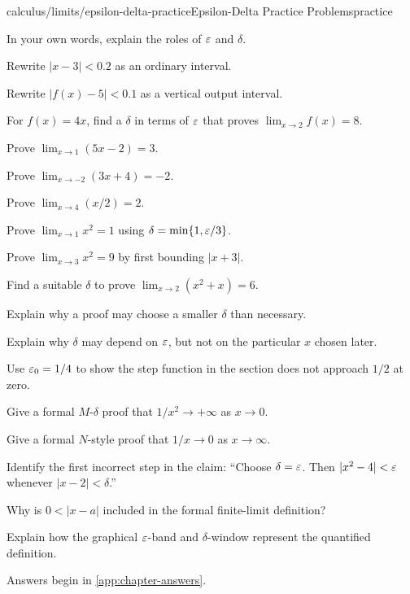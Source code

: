 \begin{webpage}{calculus/limits/epsilon-delta-practice}{Epsilon-Delta Practice Problems}{practice}
\begin{bgexercises}[label=\textbf{6.\arabic*}]
  \item In your own words, explain the roles of \(\varepsilon\) and \(\delta\).
  \item Rewrite \(|x-3|<0.2\) as an ordinary interval.
  \item Rewrite \(|f(x)-5|<0.1\) as a vertical output interval.
  \item For \(f(x)=4x\), find a \(\delta\) in terms of \(\varepsilon\) that proves \(\lim_{x\to2}f(x)=8\).
  \item Prove \(\lim_{x\to1}(5x-2)=3\).
  \item Prove \(\lim_{x\to-2}(3x+4)=-2\).
  \item Prove \(\lim_{x\to4}(x/2)=2\).
  \item Prove \(\lim_{x\to1}x^2=1\) using \(\delta=\min\{1,\varepsilon/3\}\).
  \item Prove \(\lim_{x\to3}x^2=9\) by first bounding \(|x+3|\).
  \item Find a suitable \(\delta\) to prove \(\lim_{x\to2}(x^2+x)=6\).
  \item Explain why a proof may choose a smaller \(\delta\) than necessary.
  \item Explain why \(\delta\) may depend on \(\varepsilon\), but not on the particular \(x\) chosen later.
  \item Use \(\varepsilon_0=1/4\) to show the step function in the section does not approach \(1/2\) at zero.
  \item Give a formal \(M\)-\(\delta\) proof that \(1/x^2\to+\infty\) as \(x\to0\).
  \item Give a formal \(N\)-style proof that \(1/x\to0\) as \(x\to\infty\).
  \item Identify the first incorrect step in the claim: ``Choose \(\delta=\varepsilon\). Then \(|x^2-4|<\varepsilon\) whenever \(|x-2|<\delta\).''
  \item Why is \(0<|x-a|\) included in the formal finite-limit definition?
  \item Explain how the graphical \(\varepsilon\)-band and \(\delta\)-window represent the quantified definition.
\end{bgexercises}

Answers begin in \cref{app:chapter-answers}.
\end{webpage}

